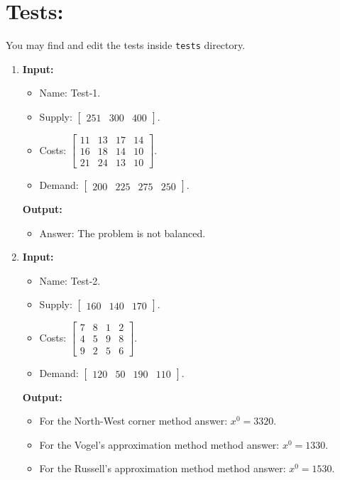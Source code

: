 \documentclass{article}
\begin{document}
\newpage

\section*{Tests:}

You may find and edit the tests inside \texttt{tests} directory.

\begin{enumerate}[label={(\arabic*)}, itemsep=0.25in]
\item \textbf{Input:}
\begin{itemize}
\item Name: Test-1.
\item Supply: \(\begin{bmatrix} 251 & 300 & 400 \end{bmatrix}\).
\item Costs: \(\begin{bmatrix}
11 & 13 & 17 & 14 \\
16 & 18 & 14 & 10 \\
21 & 24 & 13 & 10
\end{bmatrix}\).
\item Demand: \(\begin{bmatrix} 200 & 225 & 275 & 250 \end{bmatrix}\).
\end{itemize}
\textbf{Output:}
\begin{itemize}
\item Answer: The problem is not balanced.
\end{itemize}

\item \textbf{Input:}
\begin{itemize}
\item Name: Test-2.
\item Supply: \(\begin{bmatrix} 160 & 140 & 170 \end{bmatrix}\).
\item Costs: \(\begin{bmatrix}
7 & 8 & 1 & 2 \\
4 & 5 & 9 & 8 \\
9 & 2 & 5 & 6
\end{bmatrix}\).
\item Demand: \(\begin{bmatrix} 120 & 50 & 190 & 110 \end{bmatrix}\).
\end{itemize}
\textbf{Output:}
\begin{itemize}
\item For the North-West corner method answer: \(x^0 = 3320\).
\item For the Vogel’s approximation method method answer: \(x^0 = 1330\).
\item For the Russell’s approximation method method answer: \(x^0 = 1530\).
\end{itemize}


\end{enumerate}
\end{document}
